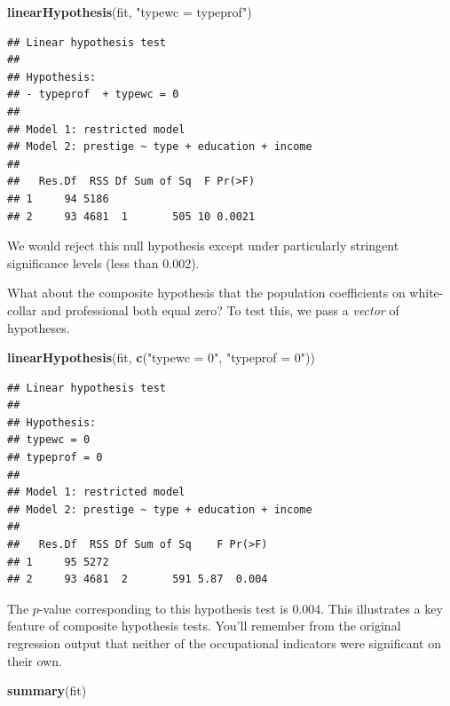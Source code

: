 \documentclass[12pt,oneside,openany]{book}
\newenvironment{Shaded}{\begin{snugshade}}{\end{snugshade}}
\newcommand{\KeywordTok}[1]{\textcolor[rgb]{0.13,0.29,0.53}{\textbf{{#1}}}}
\newcommand{\StringTok}[1]{\textcolor[rgb]{0.31,0.60,0.02}{{#1}}}
\newcommand{\NormalTok}[1]{{#1}}
\begin{document}
\begin{Shaded}
\begin{Highlighting}[]
\KeywordTok{linearHypothesis}\NormalTok{(fit, }\StringTok{"typewc = typeprof"}\NormalTok{)}
\end{Highlighting}
\end{Shaded}

\begin{verbatim}
## Linear hypothesis test
## 
## Hypothesis:
## - typeprof  + typewc = 0
## 
## Model 1: restricted model
## Model 2: prestige ~ type + education + income
## 
##   Res.Df  RSS Df Sum of Sq  F Pr(>F)
## 1     94 5186                       
## 2     93 4681  1       505 10 0.0021
\end{verbatim}

We would reject this null hypothesis except under particularly stringent
significance levels (less than 0.002).

What about the composite hypothesis that the population coefficients on
white-collar and professional both equal zero? To test this, we pass a
\emph{vector} of hypotheses.

\begin{Shaded}
\begin{Highlighting}[]
\KeywordTok{linearHypothesis}\NormalTok{(fit, }\KeywordTok{c}\NormalTok{(}\StringTok{"typewc = 0"}\NormalTok{, }\StringTok{"typeprof = 0"}\NormalTok{))}
\end{Highlighting}
\end{Shaded}

\begin{verbatim}
## Linear hypothesis test
## 
## Hypothesis:
## typewc = 0
## typeprof = 0
## 
## Model 1: restricted model
## Model 2: prestige ~ type + education + income
## 
##   Res.Df  RSS Df Sum of Sq    F Pr(>F)
## 1     95 5272                         
## 2     93 4681  2       591 5.87  0.004
\end{verbatim}

The \(p\)-value corresponding to this hypothesis test is 0.004. This
illustrates a key feature of composite hypothesis tests. You'll remember
from the original regression output that neither of the occupational
indicators were significant on their own.

\begin{Shaded}
\begin{Highlighting}[]
\KeywordTok{summary}\NormalTok{(fit)}
\end{Highlighting}
\end{Shaded}
\end{document}

